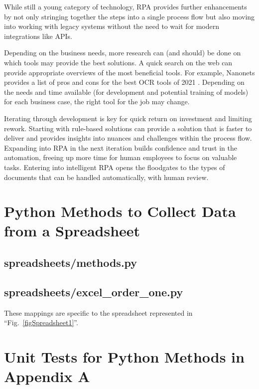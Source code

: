 \documentclass[conference]{IEEEtran}
\begin{document}
While still a young category of technology, RPA provides further enhancements by not only stringing together the steps into a single process flow but also moving into working with legacy systems without the need to wait for modern integrations like APIs.

Depending on the business needs, more research can (and should) be done on which tools may provide the best solutions. A quick search on the web can provide appropriate overviews of the most beneficial tools. For example, Nanonets provides a list of pros and cons for the best OCR tools of 2021 \cite{prithiv2021best}. Depending on the needs and time available (for development and potential training of models) for each business case, the right tool for the job may change.

Iterating through development is key for quick return on investment and limiting rework. Starting with rule-based solutions can provide a solution that is faster to deliver and provides insights into nuances and challenges within the process flow. Expanding into RPA in the next iteration builds confidence and trust in the automation, freeing up more time for human employees to focus on valuable tasks. Entering into intelligent RPA opens the floodgates to the types of documents that can be handled automatically, with human review.




\onecolumn
\appendices

\newpage
\section{Python Methods to Collect Data from a Spreadsheet} \label{appendixOrderOne}
    \subsection{spreadsheets/methods.py}
    

    \subsection{spreadsheets/excel\_order\_one.py}
    These mappings are specific to the spreadsheet represented in ``Fig.~\ref{figSpreadsheet1}''.
    

\newpage
\section{Unit Tests for Python Methods in Appendix A} \label{appendixOrderOneTests}
\end{document}
